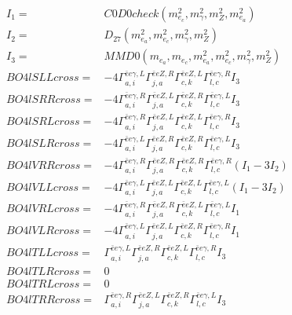 \documentclass[A4,landscape]{article}
\begin{document}
\begin{align} 
I_1 = & C0D0check(m^2_{e_{{c}}}, m^2_{\gamma}, m^2_{Z}, m^2_{e_{{a}}}) \\ 
I_2 = & D_{27}(m^2_{e_{{a}}}, m^2_{e_{{c}}}, m^2_{\gamma}, m^2_{Z}) \\ 
I_3 = & MMD0(m_{e_{{a}}}, m_{e_{{c}}}, m^2_{e_{{a}}}, m^2_{e_{{c}}}, m^2_{\gamma}, m^2_{Z}) \\ 
  BO4lSLLcross= & -4  \Gamma^{\bar{e}e \gamma ,L}_{a, i} \Gamma^{\bar{e}e Z ,R}_{j, a} \Gamma^{\bar{e}e Z ,L}_{c, k} \Gamma^{\bar{e}e \gamma ,R}_{l, c} I_3 \\ 
  BO4lSRRcross= & -4  \Gamma^{\bar{e}e \gamma ,R}_{a, i} \Gamma^{\bar{e}e Z ,L}_{j, a} \Gamma^{\bar{e}e Z ,R}_{c, k} \Gamma^{\bar{e}e \gamma ,L}_{l, c} I_3 \\ 
  BO4lSRLcross= & -4  \Gamma^{\bar{e}e \gamma ,R}_{a, i} \Gamma^{\bar{e}e Z ,L}_{j, a} \Gamma^{\bar{e}e Z ,L}_{c, k} \Gamma^{\bar{e}e \gamma ,R}_{l, c} I_3 \\ 
  BO4lSLRcross= & -4  \Gamma^{\bar{e}e \gamma ,L}_{a, i} \Gamma^{\bar{e}e Z ,R}_{j, a} \Gamma^{\bar{e}e Z ,R}_{c, k} \Gamma^{\bar{e}e \gamma ,L}_{l, c} I_3 \\ 
  BO4lVRRcross= & -4  \Gamma^{\bar{e}e \gamma ,R}_{a, i} \Gamma^{\bar{e}e Z ,R}_{j, a} \Gamma^{\bar{e}e Z ,R}_{c, k} \Gamma^{\bar{e}e \gamma ,R}_{l, c} (I_1 - 3 I_2) \\ 
  BO4lVLLcross= & -4  \Gamma^{\bar{e}e \gamma ,L}_{a, i} \Gamma^{\bar{e}e Z ,L}_{j, a} \Gamma^{\bar{e}e Z ,L}_{c, k} \Gamma^{\bar{e}e \gamma ,L}_{l, c} (I_1 - 3 I_2) \\ 
  BO4lVRLcross= & -4  \Gamma^{\bar{e}e \gamma ,R}_{a, i} \Gamma^{\bar{e}e Z ,R}_{j, a} \Gamma^{\bar{e}e Z ,L}_{c, k} \Gamma^{\bar{e}e \gamma ,L}_{l, c} I_1 \\ 
  BO4lVLRcross= & -4  \Gamma^{\bar{e}e \gamma ,L}_{a, i} \Gamma^{\bar{e}e Z ,L}_{j, a} \Gamma^{\bar{e}e Z ,R}_{c, k} \Gamma^{\bar{e}e \gamma ,R}_{l, c} I_1 \\ 
  BO4lTLLcross= &  \Gamma^{\bar{e}e \gamma ,L}_{a, i} \Gamma^{\bar{e}e Z ,R}_{j, a} \Gamma^{\bar{e}e Z ,L}_{c, k} \Gamma^{\bar{e}e \gamma ,R}_{l, c} I_3 \\ 
  BO4lTLRcross= & 0 \\ 
  BO4lTRLcross= & 0 \\ 
  BO4lTRRcross= &  \Gamma^{\bar{e}e \gamma ,R}_{a, i} \Gamma^{\bar{e}e Z ,L}_{j, a} \Gamma^{\bar{e}e Z ,R}_{c, k} \Gamma^{\bar{e}e \gamma ,L}_{l, c} I_3 \\ 
\end{align} 
\end{document}
